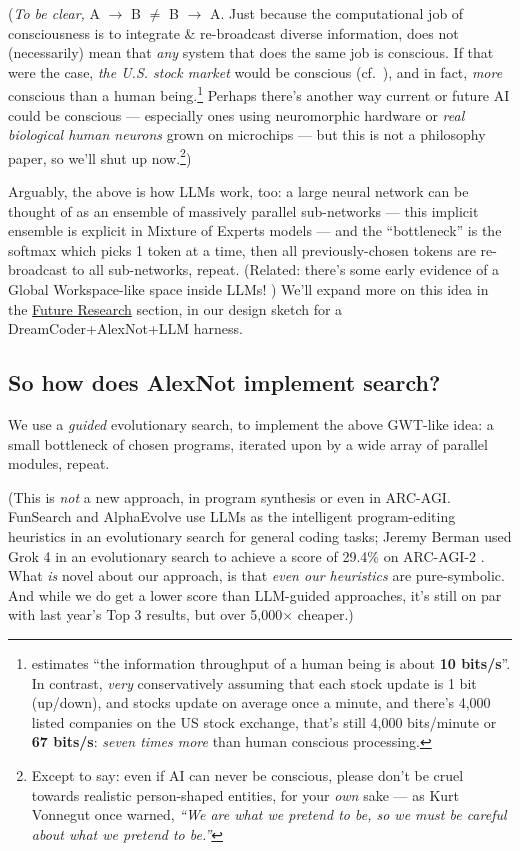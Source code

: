 \documentclass[11pt]{article}
\begin{document}
(\textit{To be clear,} A $\to$ B $\neq$ B $\to$ A. Just because the computational job of consciousness is to integrate \& re-broadcast diverse information, does not (necessarily) mean that \textit{any} system that does the same job is conscious. If that were the case, \textit{the U.S. stock market} would be conscious (cf.\ \citealp{schwitzgebel_us_conscious}), and in fact, \textit{more} conscious than a human being.\footnote{\citet{unbearable_slowness} estimates ``the information throughput of a human being is about \textbf{10 bits/s}''. In contrast, \textit{very} conservatively assuming that each stock update is 1 bit (up/down), and stocks update on average once a minute, and there's 4,000 listed companies on the US stock exchange, that's still 4,000 bits/minute or \textbf{67 bits/s}: \textit{seven times more} than human conscious processing.} Perhaps there's another way current or future AI could be conscious — especially ones using neuromorphic hardware \citep{neuromorphic_review} or \textit{real biological human neurons} grown on microchips \citep{dishbrain} — but this is not a philosophy paper, so we'll shut up now.\footnote{Except to say: even if AI can never be conscious, please don't be cruel towards realistic person-shaped entities, for your \textit{own} sake — as Kurt Vonnegut once warned, \textit{``We are what we pretend to be, so we must be careful about what we pretend to be.''}})

Arguably, the above is how LLMs work, too: a large neural network can be thought of as an ensemble of massively parallel sub-networks — this implicit ensemble is explicit in Mixture of Experts models — and the ``bottleneck'' is the softmax which picks 1 token at a time, then all previously-chosen tokens are re-broadcast to all sub-networks, repeat. (Related: there's some early evidence of a Global Workspace-like space inside LLMs! \citep{llm_global_workspace}) We'll expand more on this idea in the \hyperref[sec:limitations]{Future Research} section, in our design sketch for a DreamCoder+AlexNot+LLM harness.

\subsection{So how does AlexNot implement search?}

We use a \textit{guided} evolutionary search, to implement the above GWT-like idea: a small bottleneck of chosen programs, iterated upon by a wide array of parallel modules, repeat.

(This is \textit{not} a new approach, in program synthesis or even in ARC-AGI. FunSearch \citep{funsearch} and AlphaEvolve \citep{alphaevolve} use LLMs as the intelligent program-editing heuristics in an evolutionary search for general coding tasks; Jeremy Berman used Grok 4 in an evolutionary search to achieve a score of 29.4\% on ARC-AGI-2 \citep{berman_arc_english}. What \textit{is} novel about our approach, is that \textit{even our heuristics} are pure-symbolic. And while we do get a lower score than LLM-guided approaches, it's still on par with last year's Top 3 results, but over 5,000$\times$ cheaper.)
\end{document}
